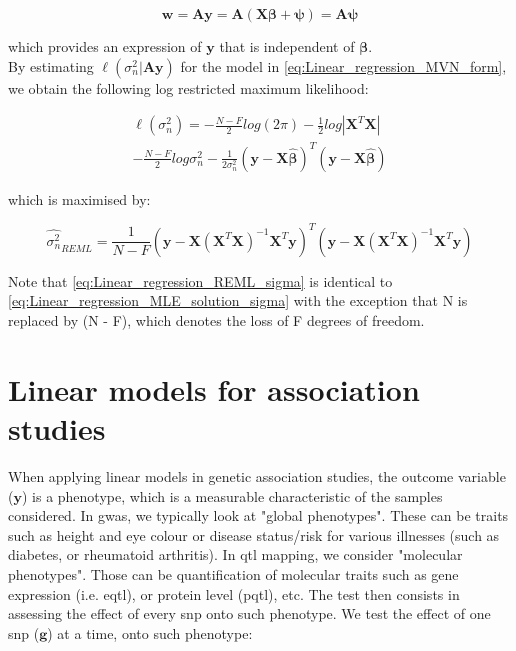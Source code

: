\begin{equation}\label{eq:REML_w_projection}
    \mathbf{w} = \mathbf{A}\mathbf{y} = \mathbf{A}(\mathbf{X}\boldsymbol{\beta} + \boldsymbol{\psi}) = \mathbf{A}\boldsymbol{\psi}
\end{equation}

which provides an expression of $\mathbf{y}$ that is independent of $\boldsymbol{\beta}$.\\

By estimating $\ell(\sigma_n^2 | \mathbf{A}\mathbf{y} )$ for the model in \eqref{eq:Linear_regression_MVN_form}, we obtain the following log restricted maximum likelihood:

\begin{equation} \label{eq:Linear_regression_log_restricted_likelihood}
\begin{split}
\ell(\sigma_n^2) = -\frac{N-F}{2}log(2\pi) - \frac{1}{2}log|\mathbf{X}^T\mathbf{X}| \\
-  \frac{N-F}{2}log\sigma_n^2 - \frac{1}{2\sigma_n^2}(\mathbf{y}-\mathbf{X}\hat{\boldsymbol{\beta}})^T(\mathbf{y}-\mathbf{X}\hat{\boldsymbol{\beta}})  
\end{split}
\end{equation}

which is maximised by:

\begin{equation}\label{eq:Linear_regression_REML_sigma}
\hat{\sigma_n^2}_{REML} =  \frac{1}{N-F}(\mathbf{y}-\mathbf{X}(\mathbf{X}^T\mathbf{X})^{-1}\mathbf{X}^T\mathbf{y})^T(\mathbf{y}-\mathbf{X}(\mathbf{X}^T\mathbf{X})^{-1}\mathbf{X}^T\mathbf{y})
\end{equation}

Note that \eqref{eq:Linear_regression_REML_sigma} is identical to \eqref{eq:Linear_regression_MLE_solution_sigma} with the exception that N is replaced by (N - F), which denotes the loss of F degrees of freedom.


\section{Linear models for association studies}

When applying linear models in genetic association studies, the outcome variable ($\mathbf{y}$) is a phenotype, which is a measurable characteristic of the samples considered. 
In \gls{gwas}, we typically look at "global phenotypes".
These can be traits such as height and eye colour or disease status/risk for various illnesses (such as diabetes, or rheumatoid arthritis).
In \gls{qtl} mapping, we consider "molecular phenotypes". 
Those can be quantification of molecular traits such as gene expression (i.e. e\gls{qtl}), or protein level (p\gls{qtl}), etc.
The test then consists in assessing the effect of every \gls{snp}  onto such phenotype. 
We test the effect of one \gls{snp} ($\mathbf{g}$) at a time, onto such phenotype:

